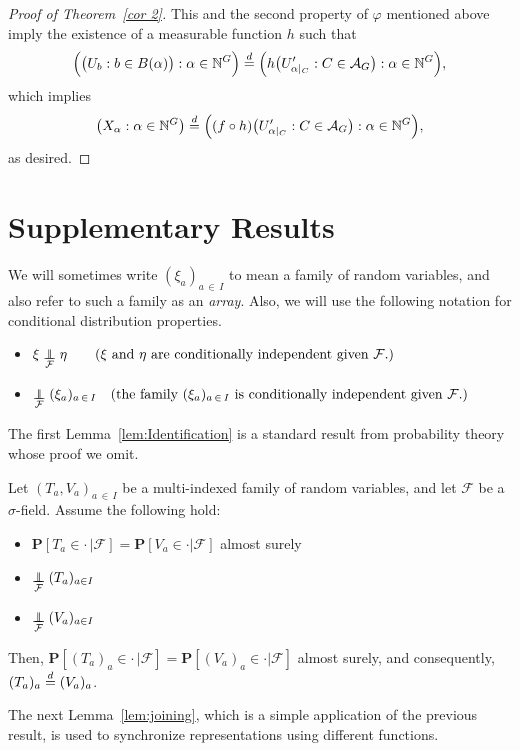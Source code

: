 \documentclass[AHL,Unicode,longabstracts,published]{cedram}
\newcommand{\independent}{\protect\mathpalette{\protect\independenT}{\perp}}\def\independenT#1#2{\mathrel{\rlap{$#1#2$}\mkern2mu{#1#2}}}
\newcommand{\indices}[1]{\mathbb{N}^{#1}}
\renewcommand{\d}{\buildrel{d}\over{=}}
\newcommand*\N{\mathbb{N}}
\renewcommand{\AA}{\mathcal{A}}
\newcommand*\FF{\mathcal{F}}
\newcommand{\Pbf}{\mathbf{P}}%
\newcommand*\N{\mathbb{N}}
\begin{document}
\begin{proof}[Proof of Theorem~\ref{cor 2}]
\goodbreak
This and the second property of $\varphi$ mentioned above imply the existence of a measurable function $h$ such that
\[
\Big(\big(U_b : b \in B(\alpha)\big) : \alpha \in \N^G\Big)
\d \Big(h\big(U'_{\alpha|_C} : C \in \AA_G\big) : \alpha \in \N^G\Big),
\]
which implies
\[
\left(X_\alpha : \alpha \in \indices G\right) \d \Big((f \circ h)\big(U'_{\alpha|_C} : C \in \AA_G\big) : \alpha \in \indices G\Big),
\]
as desired.
\end{proof}

\section{Supplementary Results}\label{App: supplementary}
We will sometimes write $(\xi_a)_{a\,\in\,I}$ to mean a family of random variables, and also refer to such a family as an \emph{array}. Also, we will use the following notation for conditional distribution properties.
\begin{itemize}
\item $\xi \underset{\mathcal{F}}{\independent} \eta \qquad (\xi \text{ and }\eta\text{ are conditionally independent given }\mathcal{F}.)$
\item $\underset{\mathcal{F}}{\independent}(\xi_a)_{a\,\in\,I} \quad (\text{the family }(\xi_a)_{a\,\in\,I}\text{ is conditionally independent given }\FF.)$
\end{itemize}

The first Lemma~\ref{lem:Identification} is a standard result from probability theory whose proof we omit.

\begin{lemm}\label{lem:Identification}
Let $(T_a, V_a)_{a\,\in\,I}$ be a multi-indexed family of random variables, and let $\mathcal{F}$ be a $\sigma$-field. Assume the following hold:
\begin{itemize}
\item $\Pbf[T_a \in \cdot\,| \FF]= \Pbf[V_a \in \cdot | \FF]$ almost surely
\item $\underset{\mathcal{F}}{\independent}(T_a)_{a\in I} $
\item $\underset{\mathcal{F}}{\independent}(V_a)_{a\in I} $
\end{itemize}
Then, $\Pbf[(T_a)_a \in \cdot\,| \FF] = \Pbf[(V_a)_a \in \cdot | \FF]$ almost surely, and consequently, $(T_a)_a \d (V_a)_a$.
\end{lemm}

The next Lemma~\ref{lem:joining}, which is a simple application of the previous result, is used to synchronize representations using different functions.
\end{document}
